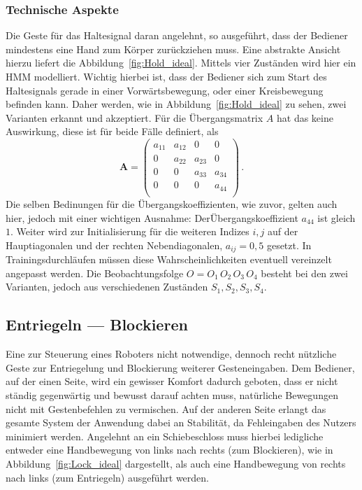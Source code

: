 \subsubsection{Technische Aspekte}
Die Geste f\"ur das Haltesignal daran angelehnt, so ausgef\"uhrt, dass der Bediener mindestens eine Hand zum K\"orper zur\"uckziehen muss. Eine abstrakte Ansicht hierzu liefert die Abbildung~\ref{fig:Hold_ideal}. Mittels vier Zust\"anden wird hier ein \acrshort{HMM} modelliert.
\newline
Wichtig hierbei ist, dass der Bediener sich zum Start des Haltesignals gerade in einer Vorw\"artsbewegung, oder einer Kreisbewegung befinden kann. Daher werden, wie in Abbildung~\ref{fig:Hold_ideal} zu sehen, zwei Varianten erkannt und akzeptiert. F\"ur die \"Ubergangsmatrix $A$ hat das keine Auswirkung, diese ist f\"ur beide F\"alle definiert, als
\begin{equation}
\mathbf{A} = 
\begin{pmatrix}
a_{11} & a_{12} & 0 & 0\\
0 & a_{22} & a_{23} & 0\\
0 & 0 & a_{33} & a_{34}\\
0 & 0 & 0 & a_{44} \\
\end{pmatrix} \, .
\end{equation}
Die selben Bedinungen f\"ur die \"Ubergangskoeffizienten, wie zuvor, gelten auch hier, jedoch mit einer wichtigen Ausnahme: Der\"Ubergangskoeffizient $a_{44}$ ist gleich $1$. Weiter wird zur Initialisierung f\"ur die weiteren Indizes $i, j$ auf der Hauptiagonalen und der rechten Nebendiagonalen, $a_{ij} = 0,5$ gesetzt. In Trainingsdurchl\"aufen m\"ussen diese Wahrscheinlichkeiten eventuell vereinzelt angepasst werden. Die Beobachtungsfolge $O = O_1\, O_2\, O_3\, O_4$ besteht bei den zwei Varianten, jedoch aus verschiedenen Zust\"anden $S_1, S_2, S_3, S_4$.

\subsection{Entriegeln --- Blockieren}

Eine zur Steuerung eines Roboters nicht notwendige, dennoch recht n\"utzliche Geste zur Entriegelung und Blockierung weiterer Gesteneingaben. Dem Bediener, auf der einen Seite, wird ein gewisser Komfort dadurch geboten, dass er nicht st\"andig gegenw\"artig und bewusst darauf achten muss, nat\"urliche Bewegungen nicht mit Gestenbefehlen zu vermischen. Auf der anderen Seite erlangt das gesamte System der Anwendung dabei an Stabilit\"at, da Fehleingaben des Nutzers minimiert werden.
\newline
Angelehnt an ein Schiebeschloss muss hierbei ledigliche entweder eine Handbewegung von links nach rechts (zum Blockieren), wie in Abbildung~\ref{fig:Lock_ideal} dargestellt, als auch eine Handbewegung von rechts nach links (zum Entriegeln) ausgef\"uhrt werden.

